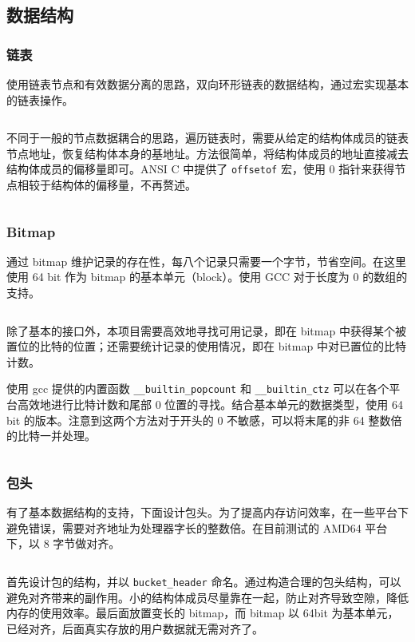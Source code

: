 \documentclass[12pt, a4paper]{article}
\newcommand{\LabSrc}[1]{\inputminted[fontsize=\scriptsize, breaklines]{c}{./src/#1.c}}
\begin{document}
\subsection{数据结构}

\subsubsection{链表}
使用链表节点和有效数据分离的思路，双向环形链表的数据结构，通过宏实现基本的链表操作。

\LabSrc{list}

不同于一般的节点数据耦合的思路，遍历链表时，需要从给定的结构体成员的链表节点地址，恢复结构体本身的基地址。方法很简单，将结构体成员的地址直接减去结构体成员的偏移量即可。ANSI C 中提供了 \texttt{offsetof} 宏，使用 0 指针来获得节点相较于结构体的偏移量，不再赘述。

\LabSrc{list_em}

\subsubsection{Bitmap}
通过 bitmap 维护记录的存在性，每八个记录只需要一个字节，节省空间。在这里使用 64 bit 作为 bitmap 的基本单元（block）。使用 GCC 对于长度为 0 的数组的支持。

\LabSrc{bitmap}

除了基本的接口外，本项目需要高效地寻找可用记录，即在 bitmap 中获得某个被置位的比特的位置；还需要统计记录的使用情况，即在 bitmap 中对已置位的比特计数。

使用 gcc 提供的内置函数 \texttt{\_\_builtin\_popcount} 和 \texttt{\_\_builtin\_ctz} 可以在各个平台高效地进行比特计数和尾部 0 位置的寻找。结合基本单元的数据类型，使用 64 bit 的版本。注意到这两个方法对于开头的 0 不敏感，可以将末尾的非 64 整数倍的比特一并处理。

\LabSrc{bitmap_em}

\subsubsection{包头}
有了基本数据结构的支持，下面设计包头。为了提高内存访问效率，在一些平台下避免错误，需要对齐地址为处理器字长的整数倍。在目前测试的 AMD64 平台下，以 8 字节做对齐。

\LabSrc{align}

首先设计包的结构，并以 \texttt{bucket\_header} 命名。通过构造合理的包头结构，可以避免对齐带来的副作用。小的结构体成员尽量靠在一起，防止对齐导致空隙，降低内存的使用效率。最后面放置变长的 bitmap，而 bitmap 以 64bit 为基本单元，已经对齐，后面真实存放的用户数据就无需对齐了。
\end{document}
